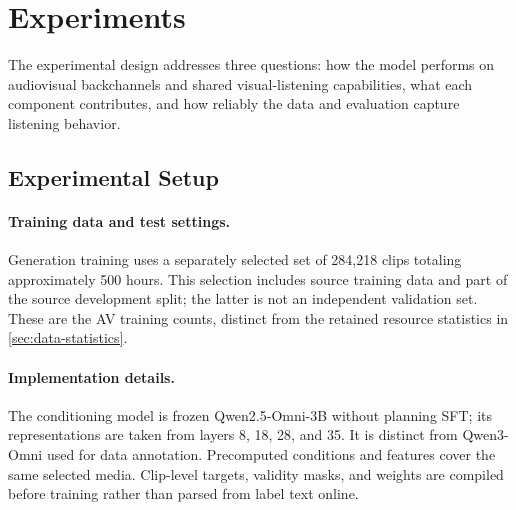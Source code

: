 \section{Experiments}
\label{sec:experiments}

The experimental design addresses three questions: how the model performs on audiovisual backchannels and shared visual-listening capabilities, what each component contributes, and how reliably the data and evaluation capture listening behavior.

\subsection{Experimental Setup}
\label{sec:setup}
\paragraph{Training data and test settings.}
Generation training uses a separately selected set of 284,218 clips totaling approximately 500 hours. This selection includes source training data and part of the source development split; the latter is not an independent validation set. These are the AV training counts, distinct from the retained resource statistics in \cref{sec:data-statistics}.

\paragraph{Implementation details.}
The conditioning model is frozen Qwen2.5-Omni-3B without planning SFT; its representations are taken from layers 8, 18, 28, and 35. It is distinct from Qwen3-Omni used for data annotation. Precomputed conditions and features cover the same selected media. Clip-level targets, validity masks, and weights are compiled before training rather than parsed from label text online.

